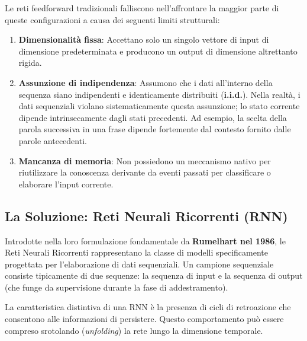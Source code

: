 ﻿\documentclass[11pt, a4paper]{article}
\begin{document}

Le reti feedforward tradizionali falliscono nell'affrontare la maggior parte di queste configurazioni a causa dei seguenti limiti strutturali:
\begin{enumerate}
    \item \textbf{Dimensionalità fissa}: Accettano solo un singolo vettore di input di dimensione predeterminata e producono un output di dimensione altrettanto rigida.
    \item \textbf{Assunzione di indipendenza}: Assumono che i dati all'interno della sequenza siano indipendenti e identicamente distribuiti (\textbf{i.i.d.}). Nella realtà, i dati sequenziali violano sistematicamente questa assunzione; lo stato corrente dipende intrinsecamente dagli stati precedenti. Ad esempio, la scelta della parola successiva in una frase dipende fortemente dal contesto fornito dalle parole antecedenti.
    \item \textbf{Mancanza di memoria}: Non possiedono un meccanismo nativo per riutilizzare la conoscenza derivante da eventi passati per classificare o elaborare l'input corrente.
\end{enumerate}

\newpage

\subsection{La Soluzione: Reti Neurali Ricorrenti (RNN)}

Introdotte nella loro formulazione fondamentale da \textbf{Rumelhart nel 1986}, le Reti Neurali Ricorrenti rappresentano la classe di modelli specificamente progettata per l'elaborazione di dati sequenziali. Un campione sequenziale consiste tipicamente di due sequenze: la sequenza di input e la sequenza di output (che funge da supervisione durante la fase di addestramento).

La caratteristica distintiva di una RNN è la presenza di cicli di retroazione che consentono alle informazioni di persistere. Questo comportamento può essere compreso srotolando (\emph{unfolding}) la rete lungo la dimensione temporale.

\end{document}
